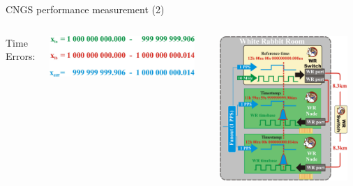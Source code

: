 \documentclass[compress,red]{beamer}
\begin{document}
\begin{frame}{CNGS performance measurement (2)}

  \begin{columns}[c]
	  \begin{center}
	  Time Errors:
	  \end{center}
	  \begin{center}
	\includegraphics[width=0.93\textwidth]{measurements/timeErrors.pdf}
	  \end{center}
		\begin{center}
		\includegraphics[width=0.93\textwidth]{measurements/performance_testing_setup-detail_v2.pdf}
		
		\end{center}
  \end{columns}


\end{frame}
\end{document}
